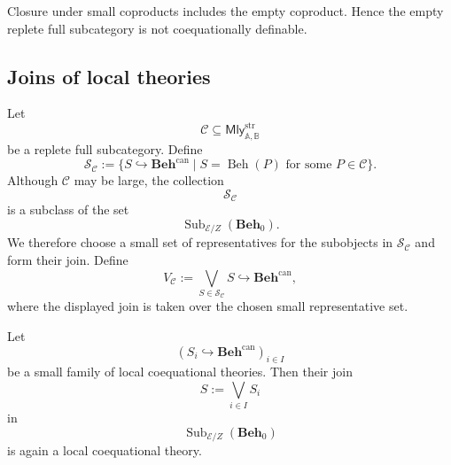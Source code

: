 Closure under small coproducts includes the empty coproduct. Hence the empty
replete full subcategory is not coequationally definable.

\subsection{Joins of local theories}
\label{subsec:joins-local-theories}

Let
\[
    \mathcal C\subseteq\mathsf{Mly}^{\mathrm{str}}_{\mathbb A,\mathbb B}
\]
be a replete full subcategory. Define
\[
    \mathcal S_{\mathcal C}
    :=
    \{
        S\hookrightarrow\mathbf{Beh}^{\mathrm{can}}
        \mid
        S=\operatorname{Beh}(P)
        \text{ for some }P\in\mathcal C
    \}.
\]
Although \(\mathcal C\) may be large, the collection
\[
    \mathcal S_{\mathcal C}
\]
is a subclass of the set
\[
    \operatorname{Sub}_{\mathcal E/Z}(\mathbf{Beh}_0).
\]
We therefore choose a small set of representatives for the subobjects in
\(\mathcal S_{\mathcal C}\) and form their join. Define
\[
    V_{\mathcal C}
    :=
    \bigvee_{S\in\mathcal S_{\mathcal C}}S
    \hookrightarrow\mathbf{Beh}^{\mathrm{can}},
\]
where the displayed join is taken over the chosen small representative set.

\begin{lemma}
\label{lem:joins-derivative-closed}
    Let
    \[
        (S_i\hookrightarrow\mathbf{Beh}^{\mathrm{can}})_{i\in I}
    \]
    be a small family of local coequational theories. Then their join
    \[
        S:=\bigvee_{i\in I}S_i
    \]
    in
    \[
        \operatorname{Sub}_{\mathcal E/Z}(\mathbf{Beh}_0)
    \]
    is again a local coequational theory.
\end{lemma}

